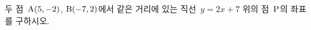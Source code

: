 두 점~$\mathrm{A}(5{,}\mkern3mu\mathopen{}-2)$, $\mathrm{B}(-7{,}\mkern3mu\mathopen{}2)$에서 같은 거리에 있는 \mbox{직선~$y=2x+7$} 위의 점~$\mathrm{P}$의 좌표를 구하시오.
